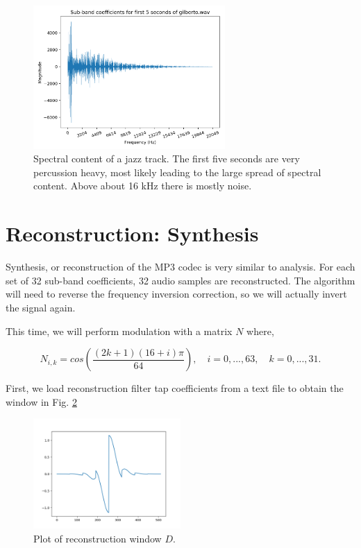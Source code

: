 \documentclass[11pt,a4paper]{article}
\begin{document}
\clearpage

\begin{figure}[ht]
	\centering
	\includegraphics[width=0.65\textwidth]{analysis/gilberto}
	\caption{Spectral content of a jazz track. The first five seconds are very percussion heavy, most likely leading to the large spread of spectral content. Above about 16 kHz there is mostly noise.}
	\label{fig:analysis_gilberto}
\end{figure}

\pagebreak

\section{Reconstruction: Synthesis}
Synthesis, or reconstruction of the MP3 codec is very similar to analysis. For each set of 32 sub-band coefficients, 32 audio samples are reconstructed. The algorithm will need to reverse the frequency inversion correction, so we will actually invert the signal again.

This time, we will perform modulation with a matrix $N$ where,

\begin{equation}
N_{i,k} = cos\left(\frac{(2k+1)(16+i)\pi}{64} \right), \quad i = 0,...,63, \quad k=0,...,31.
\end{equation}

First, we load reconstruction filter tap coefficients from a text file to obtain the window in Fig. \ref{fig:d_taps}

\begin{figure}[ht]
	\centering
	\includegraphics[width=0.5\textwidth]{synthesis/d_taps}
	\caption{Plot of reconstruction window $D$.}
	\label{fig:d_taps}
\end{figure}
\end{document}
